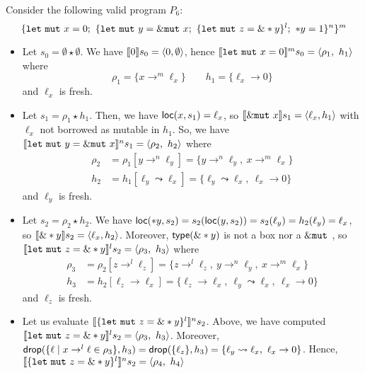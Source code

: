 \begin{example}\label{ex:program-reborrow-valid}
  Consider the following valid program $P_6$:
  \[
    \{
      \mathtt{let\ mut}\ x = 0;\
      \{
        \mathtt{let\ mut}\ y = \mutborrow x;\
        \{
          \mathtt{let\ mut}\ z = \borrow*y
        \}^l;\
        *y = 1
      \}^n
    \}^m
  \]
  \begin{itemize}
    \item Let $s_0=\emptyset \star \emptyset$.
    We have $\den[0]{s_0} = \langle 0,\emptyset\rangle$, hence
    $\denl[\mathtt{let\ mut}\ x = 0]{m}{s_0} =
    \langle \rho_1,\ h_1\rangle$ where
    \[\rho_1=\{x\to^m\ell_x\} \qquad
    h_1 = \{\ell_x\to 0\}\]
    and $\ell_x$ is fresh.
    \item Let $s_1 = \rho_1 \star h_1$.
    Then, we have $\loc(x,s_1) = \ell_x$, so
    $\den[\mutborrow x]{s_1} = \langle\ell_x, h_1\rangle$
    with $\ell_x$ not borrowed as mutable in $h_1$.
    So, we have
    $\denl[\mathtt{let\ mut}\ y = \mutborrow x]{n}{s_1} =
    \langle \rho_2,\ h_2\rangle$
    where
    \begin{align*}
      \rho_2 & = \rho_1[y\to^n\ell_y] = \{y\to^n\ell_y,\ x\to^m\ell_x\}\\
      h_2 & = h_1[\ell_y\leadsto \ell_x] =
      \{\ell_y\leadsto \ell_x,\ \ell_x\to 0\}
    \end{align*}
    and $\ell_y$ is fresh.
    \item Let $s_2 = \rho_2 \star h_2$.
    We have $\loc(*y,s_2) = s_2(\loc(y,s_2)) = s_2(\ell_y) = h_2(\ell_y) = \ell_x$,
    so $\den[\borrow*y]{s_2} = \langle \ell_x,h_2\rangle$.
    Moreover, $\type(\borrow*y)$ is not a box nor a $\mutborrow$, so
    $\denl[\mathtt{let\ mut}\ z = \borrow*y]{l}{s_2} =
    \langle \rho_3,\ h_3\rangle$
    where
    \begin{align*}
      \rho_3 & = \rho_2[z\to^l\ell_z] = \{z\to^l\ell_z,\ y\to^n\ell_y,\ x\to^m\ell_x\}\\
      h_3 & = h_2[\ell_z\to \ell_x] =
      \{\ell_z\to \ell_x,\ \ell_y\leadsto \ell_x,\ \ell_x\to 0\}
    \end{align*}
    and $\ell_z$ is fresh.
    \item Let us evaluate $\denl[\{\mathtt{let\ mut}\ z = \borrow*y\}^l]{n}{s_2}$.
    Above, we have computed $\denl[\mathtt{let\ mut}\ z = \borrow*y]{l}{s_2} =
    \langle \rho_3,\ h_3\rangle$. Moreover,
    $\drop(\{\ell\mid x\to^l\ell\in\rho_3\},h_3) = \drop(\{\ell_z\},h_3) =
    \{\ell_y\leadsto \ell_x,\ \ell_x\to 0\}$. Hence,
    $\denl[\{\mathtt{let\ mut}\ z = \borrow*y\}^l]{n}{s_2}=\langle \rho_4,\ h_4\rangle$

\end{itemize}
\end{example}
